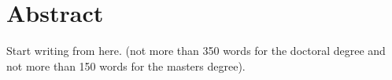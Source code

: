 \doublespacing
\chapter*{Abstract}
 Start writing from here.
(not more than 350 words for the doctoral degree and not more than
150 words for the masters degree).
